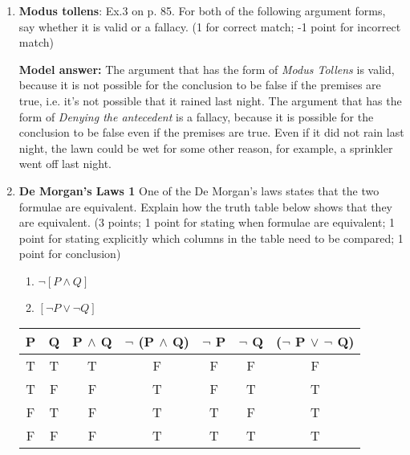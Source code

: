 \documentclass[a4,11pt]{article}
\begin{document}
\begin{enumerate}[leftmargin = 12pt]
\begin{enumerate}[noitemsep]
\item Modus Ponens
\item Modus Tollens
\item Denying the antecedent
\item Affirming the consequent
\end{enumerate}

{\bf Model answer:} The correct answer is \textit{Modus Tollens}.

\item {\bf Modus tollens}: Ex.3 on p. 85. For both of the following argument forms, say whether it is valid or a fallacy.  (1 for correct match; -1 point for incorrect match)

{\bf Model answer:} The argument that has the form of {\it Modus Tollens} is valid, because it is not possible for the conclusion to be false if the premises are true, i.e. it's not possible that it rained last night. The argument that has the form of {\it Denying the antecedent} is a fallacy, because it is possible for the conclusion to be false even if the premises are true. Even if it did not rain last night, the lawn could be wet for some other reason, for example, a sprinkler went off last night.


\item {\bf De Morgan's Laws 1} One of the De Morgan's laws states that the two formulae are equivalent. Explain how the truth table below shows that they are equivalent. (3 points; 1 point for stating when formulae are equivalent; 1 point for stating explicitly which columns in the table need to be compared; 1 point for conclusion)

\begin{enumerate}
\item  $\neg [ P \land  Q ]$
\item  $ [ \neg P \lor \neg Q ]$
\end{enumerate}


\begin{tabular}{c | c | c | c | c | c | c}
\hline \hline
P & Q & P $\land$ Q & $\neg$ (P $\land$ Q) & $\neg$ P & $\neg$ Q & ($\neg$ P $\lor$ $\neg$ Q) \\
\hline \hline
T & T & T  & F & F & F & F\\
T & F & F & T & F & T & T\\
F & T & F& T & T & F & T\\
F & F & F& T& T & T & T\\
\hline \hline



\end{tabular}
\end{enumerate}
\end{document}

